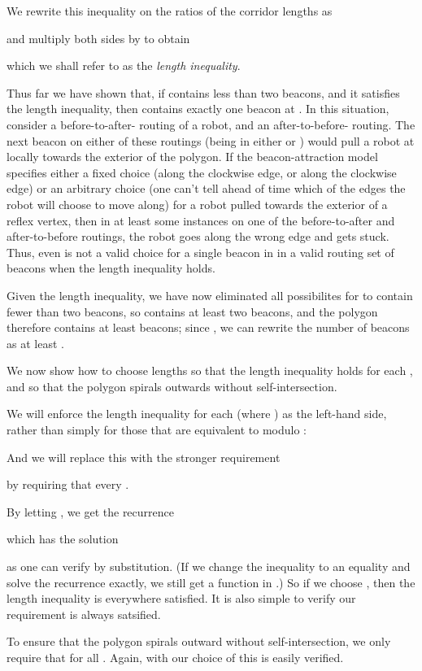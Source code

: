 \documentclass{article}
\begin{document}
We rewrite this inequality on the ratios of the corridor lengths as
	
and multiply both sides by  to obtain
	
which we shall refer to as the \emph{length inequality}.

Thus far we have shown that, if  contains less than two beacons, and
it satisfies the length inequality, then  contains exactly one beacon
at .  
In this situation, consider a before-to-after- routing of a robot, and an
after-to-before- routing.
The next beacon on either of these routings
(being in either  
 or )
would pull a robot at 
locally towards the exterior of the polygon.
If the beacon-attraction model specifies either a fixed choice (along the
clockwise edge, or along the clockwise edge) or an arbitrary choice (one can't
tell ahead of time which of the edges the robot will choose to move along)
for a robot pulled towards the exterior of a reflex vertex, then in at least
some instances on one of the before-to-after and after-to-before routings, the
robot goes along the wrong edge and gets stuck.
Thus, even  is not a valid choice for a single beacon in  in a
valid routing set of beacons  when the length inequality holds.

Given the length inequality, we have now eliminated all possibilites for 
to contain fewer than two beacons, so  contains at least two beacons, and
the polygon therefore contains at least  beacons; since , we can
rewrite the number of beacons as at least .

We now show how to choose lengths  so that the length
inequality holds for each , and so that the polygon spirals
outwards without self-intersection.

We will enforce the length inequality for each  (where ) as the
left-hand side, rather than simply for those  that are equivalent to  modulo :

And we will replace this with the stronger requirement

by requiring that every .

By letting , we get the recurrence

which has the solution

as one can verify by substitution.
(If we change the inequality to an equality and solve the recurrence exactly,
we still get a function in .)
So if we choose , then the length inequality is
everywhere satisfied.
It is also simple to verify our requirement  is always satsified.

To ensure that the polygon spirals outward without
self-intersection, we only require that  for all .  Again, with our choice of  this is easily verified.
\end{document}
